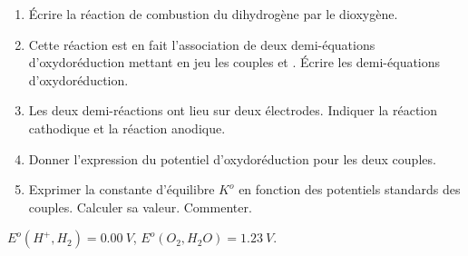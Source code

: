 \begin{enumerate}
	\item Écrire la réaction de combustion du dihydrogène par le dioxygène.
	\item Cette réaction est en fait l'association de deux demi-équations d'oxydoréduction mettant en jeu les couples  et . Écrire les demi-équations d'oxydoréduction.
	\item Les deux demi-réactions ont lieu sur deux électrodes. Indiquer la réaction cathodique et la réaction anodique.
	\item Donner l'expression du potentiel d'oxydoréduction pour les deux couples.
	\item Exprimer la constante d'équilibre $K^o$ en fonction des potentiels standards des couples. Calculer sa valeur. Commenter.
\end{enumerate}

 $E^o(H^+, H_2) = 0.00~V$, $E^o(O_2, H_2O) = 1.23~V$.